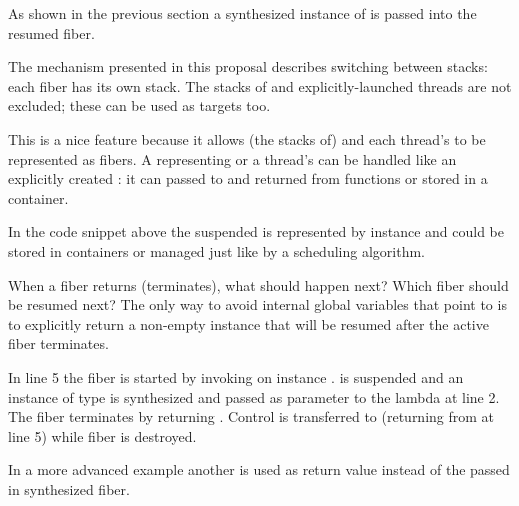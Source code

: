 
\label{representation}
As shown in the previous section a synthesized instance of \fiber is passed
into the resumed fiber.


The mechanism presented in this proposal describes switching between stacks: each
fiber has its own stack. The stacks of \main and explicitly-launched threads
are not excluded; these can be used as targets too.


This is a nice feature because it allows (the stacks of) \main and each
thread's \entryfn to be represented as fibers. A \fiber
representing \main or a thread's \entryfn can be handled like an
explicitly created \fiber: it can passed to and returned from functions or
stored in a container.

In the code snippet above the suspended \main is represented by instance
 and could be stored in containers or managed just like 
by a scheduling algorithm.


 When a fiber returns (terminates), what
should happen next? Which fiber should be resumed next? The only way to avoid
internal global variables that point to \main is to explicitly return a non-empty
\fiber instance that will be resumed after the active fiber terminates.

In line 5 the fiber is started by invoking \resume on instance . \main
is suspended and an instance of type  is synthesized and passed as
parameter  to the lambda at line 2. The fiber terminates by returning
. Control is transferred to \main (returning from  at
line 5) while fiber  is destroyed.

In a more advanced example another \fiber is used as return value instead of the
passed in synthesized fiber.

